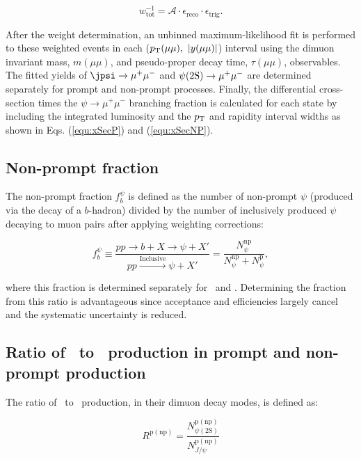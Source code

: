 \begin{equation*}
w_{\mathrm{tot}}^{-1} = \mathcal{A} \cdot \epsilon_{\mathrm{reco}} \cdot \epsilon_{\mathrm{trig}}.
\end{equation*}

After the weight determination, an unbinned maximum-likelihood fit is performed to these weighted events in each ($\mbox{$p_{\text{T}}$} (\mu\mu), \ |y(\mu\mu)|$) interval using the 
dimuon invariant mass, $m(\mu\mu)$, and pseudo-proper decay time, $\tau(\mu\mu)$, observables. 
The fitted yields of $\jpsi \rightarrow \mu^+\mu^-$ and $\psi(2\mathrm{S}) \rightarrow \mu^+\mu^-$ are determined separately for prompt and non-prompt processes. 
Finally, the differential cross-section times the  $\psi \rightarrow \mu^+\mu^-$ branching fraction is calculated for each
state by including the integrated luminosity and the $\mbox{$p_{\text{T}}$}$ and rapidity interval widths as shown in Eqs. (\ref{equ:xSecP}) and (\ref{equ:xSecNP}).


\subsection{Non-prompt fraction}
\label{sec:s:NPFDet}

The non-prompt fraction $f_{b}^{\psi}$ is defined as the number of non-prompt $\psi$ (produced
via the decay of a $b$-hadron) divided by the number of inclusively produced $\psi$ decaying to muon pairs after applying weighting corrections:

\begin{equation*}
f_{b}^{\psi} \equiv \frac{pp \rightarrow b + X \rightarrow \psi + X'}{pp \xrightarrow{\mathrm{Inclusive}} \psi + X'} = \frac{N^{\mathrm{np}}_{\psi}}{N^{\mathrm{np}}_{\psi} + N^{\mathrm{p}}_{\psi}}, 
\end{equation*}

\noindent where this fraction is determined separately for \jpsi\ and \psiprime. 
Determining the fraction from this ratio is advantageous since acceptance and efficiencies largely cancel and the systematic uncertainty is reduced.

\subsection{Ratio of \psiprime\ to \jpsi\ production in prompt and non-prompt production}
\label{sec:s:PNPRatioDet}

The ratio of \psiprime\ to \jpsi\ production, in their dimuon decay modes, is defined as:

\begin{equation*}
R^{\mathrm{p(np)}} =\frac{N^{\mathrm{p(np)}} _{\psi(2\mathrm{S})}}{N^{\mathrm{p(np)}} _{J/\psi}}
\end{equation*}


